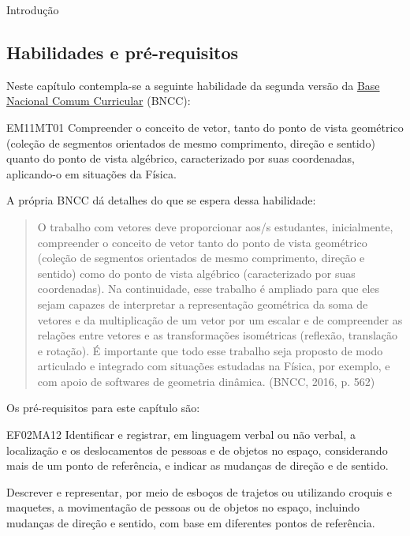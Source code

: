 \begin{apresentacao}{Introdução}

\subsection{Habilidades e pré-requisitos}

Neste capítulo contempla-se a seguinte habilidade da segunda versão da \href{http://historiadabncc.mec.gov.br/documentos/bncc-2versao.revista.pdf}{Base Nacional Comum Curricular} (BNCC):

\begin{habilities}{EM11MT01}
Compreender o conceito de vetor, tanto do ponto de vista geométrico (coleção de segmentos orientados de mesmo comprimento, direção e sentido) quanto do ponto de vista algébrico, caracterizado por suas coordenadas, aplicando-o em situações da Física.
\end{habilities}

A própria BNCC dá detalhes do que se espera dessa habilidade:
\begin{quote}

O trabalho com vetores deve proporcionar aos/s estudantes, inicialmente, compreender o conceito de vetor tanto do ponto de vista geométrico (coleção de segmentos orientados de mesmo comprimento, direção e sentido) como do ponto de vista algébrico (caracterizado por suas coordenadas). Na continuidade, esse trabalho é ampliado para que eles sejam capazes de interpretar a representação geométrica da soma de vetores e da multiplicação de um vetor por um escalar e de compreender as relações entre vetores e as transformações isométricas (reflexão, translação e rotação). É importante que todo esse trabalho seja proposto de modo articulado e integrado com situações estudadas na Física, por exemplo, e com apoio de softwares de geometria dinâmica. (BNCC, 2016, p. 562)
\end{quote}

Os pré-requisitos para este capítulo são:
\begin{habilities}{EF02MA12} Identificar e registrar, em linguagem verbal ou não verbal, a localização e os deslocamentos de pessoas e de objetos no espaço, considerando mais de um ponto de referência, e indicar as mudanças de direção e de sentido.

 Descrever e representar, por meio de esboços de trajetos ou utilizando croquis e maquetes, a movimentação de pessoas ou de objetos no espaço, incluindo mudanças de direção e sentido, com base em diferentes pontos de referência.


\end{habilities}
\end{apresentacao}
